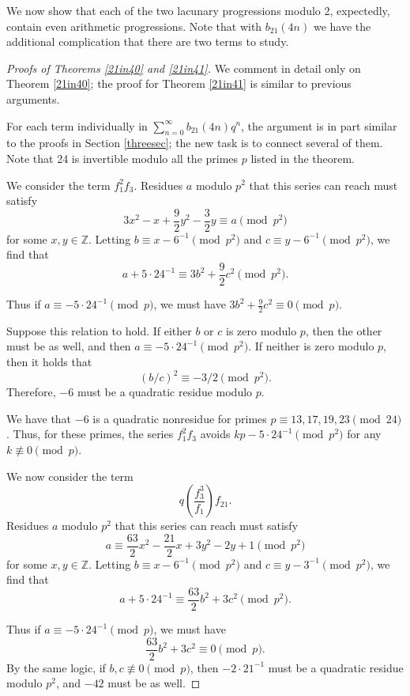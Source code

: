 \documentclass[12pt]{amsart}
\theoremstyle{definition}
\begin{document}
We now show that each of the two lacunary progressions modulo 2, expectedly, contain even arithmetic progressions. Note that with $b_{21}(4n)$ we have the additional complication that there are two terms to study.

\begin{proof}[Proofs of Theorems \ref{21in40} and \ref{21in41}] We comment in detail only on Theorem \ref{21in40}; the proof for Theorem \ref{21in41} is similar to previous arguments.

For each term individually in $\sum_{n=0}^\infty b_{21}(4n) q^n$, the argument is in part similar to the proofs in Section \ref{threesec}; the new task is to connect several of them. Note that 24 is invertible modulo all the primes $p$ listed in the theorem.

We consider the term $f_1^2 f_3$.  Residues $a$ modulo $p^2$ that this series can reach must satisfy $$3x^2-x + \frac{9}{2}y^2 - \frac{3}{2}y \equiv a \pmod{p^2}$$ \noindent for some $x, y \in \mathbb{Z}$.  Letting $b \equiv x - 6^{-1} \pmod{p^2}$ and $c \equiv y - 6^{-1} \pmod{p^2}$, we find that $$a + 5 \cdot 24^{-1} \equiv 3 b^2 + \frac{9}{2} c^2 \pmod{p^2}.$$

Thus if $a \equiv -5 \cdot 24^{-1} \pmod{p}$, we must have $3b^2 + \frac{9}{2} c^2 \equiv 0 \pmod{p}$.

Suppose this relation to hold.  If either  $b$ or $c$ is zero modulo $p$, then the other must be as well, and then $a \equiv -5 \cdot 24^{-1} \pmod{p^2}$.  If neither is zero modulo $p$, then it holds that $$(b/c)^2 \equiv -3/2 \pmod{p^2}.$$ Therefore, $-6$ must be a quadratic residue modulo $p$.

We have that $-6$ is a quadratic nonresidue for primes $p \equiv 13, 17, 19, 23 \pmod{24}$.  Thus, for these primes, the series $f_1^2 f_3$ avoids $k p - 5\cdot24^{-1} \pmod{p^2}$ for any $k \not\equiv 0 \pmod{p}$.

We now consider the term $$q \left( \frac{f_3^3}{f_1} \right) f_{21}.$$
Residues $a$ modulo $p^2$ that this series can reach must satisfy $$a \equiv \frac{63}{2}x^2 - \frac{21}{2}x + 3y^2 -2y + 1 \pmod{p^2}$$ \noindent for some $x, y \in \mathbb{Z}$.  Letting $b \equiv x-6^{-1} \pmod{p^2}$ and $c \equiv y - 3^{-1} \pmod{p^2}$, we find that $$a + 5 \cdot 24^{-1} \equiv \frac{63}{2} b^2 + 3c^2 \pmod{p^2}.$$

Thus if $a \equiv -5 \cdot 24^{-1} \pmod{p}$, we must have $$\frac{63}{2} b^2 + 3c^2 \equiv 0 \pmod{p}.$$
By the same logic, if $b, c \not\equiv 0 \pmod{p}$, then $-2 \cdot 21^{-1}$ must be a quadratic residue modulo $p^2$, and $-42$ must be as well.


\end{proof}
\end{document}
